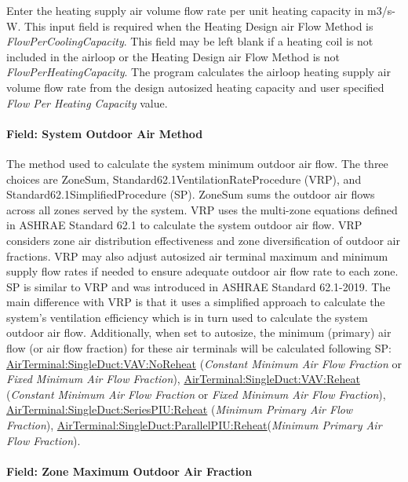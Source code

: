 Enter the heating supply air volume flow rate per unit heating capacity in m3/s-W. This input field is required when the Heating Design air Flow Method is \emph{FlowPerCoolingCapacity}. This field may be left blank if a heating coil is not included in the airloop or the Heating Design air Flow Method is not \emph{FlowPerHeatingCapacity}. The program calculates the airloop heating supply air volume flow rate from the design autosized heating capacity and user specified \emph{Flow Per Heating Capacity} value.

\paragraph{Field: System Outdoor Air Method}\label{field-system-outdoor-air-method-000}

The method used to calculate the system minimum outdoor air flow. The three choices are ZoneSum, Standard62.1VentilationRateProcedure (VRP), and Standard62.1SimplifiedProcedure (SP). ZoneSum sums the outdoor air flows across all zones served by the system. VRP uses the multi-zone equations defined in ASHRAE Standard 62.1 to calculate the system outdoor air flow. VRP considers zone air distribution effectiveness and zone diversification of outdoor air fractions. VRP may also adjust autosized air terminal maximum and minimum supply flow rates if needed to ensure adequate outdoor air flow rate to each zone. SP is similar to VRP and was introduced in ASHRAE Standard 62.1-2019. The main difference with VRP is that it uses a simplified approach to calculate the system's ventilation efficiency which is in turn used to calculate the system outdoor air flow. Additionally, when set to autosize, the minimum (primary) air flow (or air flow fraction) for these air terminals will be calculated following SP: \hyperref[airterminalsingleductvavnoreheat]{AirTerminal:SingleDuct:VAV:NoReheat} (\emph{Constant Minimum Air Flow Fraction} or \emph{Fixed Minimum Air Flow Fraction}), 
\hyperref[airterminalsingleductvavreheat]{AirTerminal:SingleDuct:VAV:Reheat} (\emph{Constant Minimum Air Flow Fraction} or \emph{Fixed Minimum Air Flow Fraction}), \hyperref[airterminalsingleductseriespiureheat]{AirTerminal:SingleDuct:SeriesPIU:Reheat} (\emph{Minimum Primary Air Flow Fraction}), 
 \hyperref[airterminalsingleductparallelpiureheat]{AirTerminal:SingleDuct:ParallelPIU:Reheat}(\emph{Minimum Primary Air Flow Fraction}).

\paragraph{Field: Zone Maximum Outdoor Air Fraction}\label{field-zone-maximum-outdoor-air-fraction-000}

